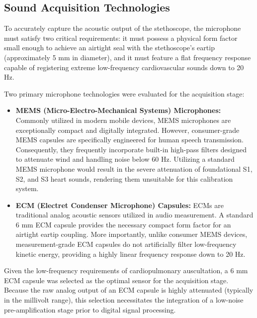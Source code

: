 \subsection{Sound Acquisition Technologies}
\label{sec:Ch3.1.2}

To accurately capture the acoustic output of the stethoscope, the microphone must satisfy two critical requirements: it must possess a physical form factor small enough to achieve an airtight seal with the stethoscope's eartip (approximately 5 mm in diameter), and it must feature a flat frequency response capable of registering extreme low-frequency cardiovascular sounds down to 20 Hz. 

Two primary microphone technologies were evaluated for the acquisition stage:

\begin{itemize}
    \item \textbf{MEMS (Micro-Electro-Mechanical Systems) Microphones:} Commonly utilized in modern mobile devices, MEMS microphones are exceptionally compact and digitally integrated. However, consumer-grade MEMS capsules are specifically engineered for human speech transmission. Consequently, they frequently incorporate built-in high-pass filters designed to attenuate wind and handling noise below 60 Hz. Utilizing a standard MEMS microphone would result in the severe attenuation of foundational S1, S2, and S3 heart sounds, rendering them unsuitable for this calibration system.
    
    \item \textbf{ECM (Electret Condenser Microphone) Capsules:} ECMs are traditional analog acoustic sensors utilized in audio measurement. A standard 6 mm ECM capsule provides the necessary compact form factor for an airtight eartip coupling. More importantly, unlike consumer MEMS devices, measurement-grade ECM capsules do not artificially filter low-frequency kinetic energy, providing a highly linear frequency response down to 20 Hz.
\end{itemize}

Given the low-frequency requirements of cardiopulmonary auscultation, a 6 mm ECM capsule was selected as the optimal sensor for the acquisition stage. Because the raw analog output of an ECM capsule is highly attenuated (typically in the millivolt range), this selection necessitates the integration of a low-noise pre-amplification stage prior to digital signal processing.

